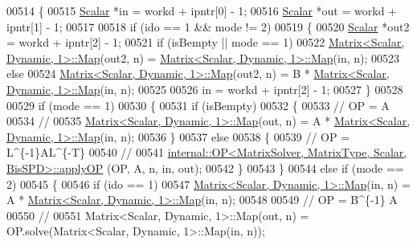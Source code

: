 \begin{DoxyCode}
00514     \{
00515       \hyperlink{class_eigen_1_1_arpack_generalized_self_adjoint_eigen_solver_ab1182405bfe87a505d4b7a8311c661ec}{Scalar} *in  = workd + ipntr[0] - 1;
00516       \hyperlink{class_eigen_1_1_arpack_generalized_self_adjoint_eigen_solver_ab1182405bfe87a505d4b7a8311c661ec}{Scalar} *out = workd + ipntr[1] - 1;
00517 
00518       \textcolor{keywordflow}{if} (ido == 1 && mode != 2)
00519       \{
00520           \hyperlink{class_eigen_1_1_arpack_generalized_self_adjoint_eigen_solver_ab1182405bfe87a505d4b7a8311c661ec}{Scalar} *out2 = workd + ipntr[2] - 1;
00521           \textcolor{keywordflow}{if} (isBempty || mode == 1)
00522             \hyperlink{group___core___module_class_eigen_1_1_matrix}{Matrix<Scalar, Dynamic, 1>::Map}(out2, n) = 
      \hyperlink{group___core___module_class_eigen_1_1_matrix}{Matrix<Scalar, Dynamic, 1>::Map}(in, n);
00523           \textcolor{keywordflow}{else}
00524             \hyperlink{group___core___module_class_eigen_1_1_matrix}{Matrix<Scalar, Dynamic, 1>::Map}(out2, n) = B * 
      \hyperlink{group___core___module_class_eigen_1_1_matrix}{Matrix<Scalar, Dynamic, 1>::Map}(in, n);
00525           
00526           in = workd + ipntr[2] - 1;
00527       \}
00528 
00529       \textcolor{keywordflow}{if} (mode == 1)
00530       \{
00531         \textcolor{keywordflow}{if} (isBempty)
00532         \{
00533           \textcolor{comment}{// OP = A}
00534           \textcolor{comment}{//}
00535           \hyperlink{group___core___module_class_eigen_1_1_matrix}{Matrix<Scalar, Dynamic, 1>::Map}(out, n) = A * 
      \hyperlink{group___core___module_class_eigen_1_1_matrix}{Matrix<Scalar, Dynamic, 1>::Map}(in, n);
00536         \}
00537         \textcolor{keywordflow}{else}
00538         \{
00539           \textcolor{comment}{// OP = L^\{-1\}AL^\{-T\}}
00540           \textcolor{comment}{//}
00541           \hyperlink{struct_eigen_1_1internal_1_1_o_p}{internal::OP<MatrixSolver, MatrixType, Scalar, BisSPD>::applyOP}
      (OP, A, n, in, out);
00542         \}
00543       \}
00544       \textcolor{keywordflow}{else} \textcolor{keywordflow}{if} (mode == 2)
00545       \{
00546         \textcolor{keywordflow}{if} (ido == 1)
00547           \hyperlink{group___core___module_class_eigen_1_1_matrix}{Matrix<Scalar, Dynamic, 1>::Map}(in, n)  = A * 
      \hyperlink{group___core___module_class_eigen_1_1_matrix}{Matrix<Scalar, Dynamic, 1>::Map}(in, n);
00548         
00549         \textcolor{comment}{// OP = B^\{-1\} A}
00550         \textcolor{comment}{//}
00551         Matrix<Scalar, Dynamic, 1>::Map(out, n) = OP.solve(Matrix<Scalar, Dynamic, 1>::Map(in, n));

\end{DoxyCode}
